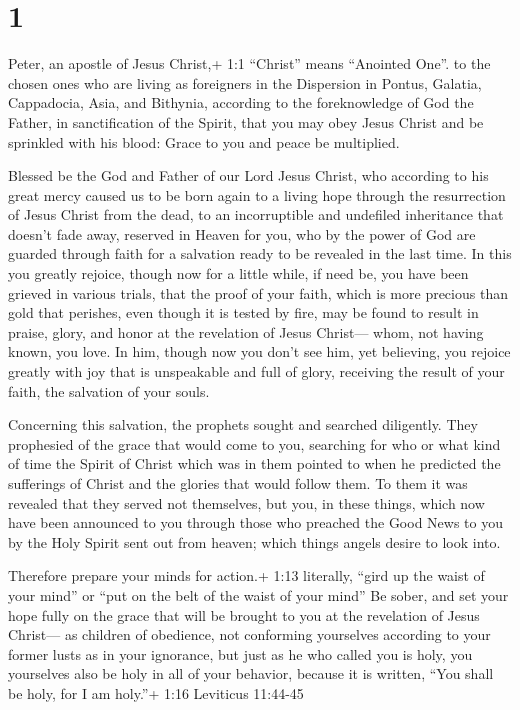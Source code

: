 \hypertarget{section}{%
\section{1}\label{section}}

 Peter, an apostle of Jesus Christ,+ 1:1 ``Christ'' means
``Anointed One''. to the chosen ones who are living as foreigners in the
Dispersion in Pontus, Galatia, Cappadocia, Asia, and Bithynia,
 according to the foreknowledge of God the Father, in
sanctification of the Spirit, that you may obey Jesus Christ and be
sprinkled with his blood: Grace to you and peace be multiplied.

 Blessed be the God and Father of our Lord Jesus Christ, who
according to his great mercy caused us to be born again to a living hope
through the resurrection of Jesus Christ from the dead,  to
an incorruptible and undefiled inheritance that doesn't fade away,
reserved in Heaven for you,  who by the power of God are
guarded through faith for a salvation ready to be revealed in the last
time.  In this you greatly rejoice, though now for a little
while, if need be, you have been grieved in various trials, 
that the proof of your faith, which is more precious than gold that
perishes, even though it is tested by fire, may be found to result in
praise, glory, and honor at the revelation of Jesus Christ---
 whom, not having known, you love. In him, though now you
don't see him, yet believing, you rejoice greatly with joy that is
unspeakable and full of glory,  receiving the result of your
faith, the salvation of your souls.

 Concerning this salvation, the prophets sought and
searched diligently. They prophesied of the grace that would come to
you,  searching for who or what kind of time the Spirit of
Christ which was in them pointed to when he predicted the sufferings of
Christ and the glories that would follow them.  To them it
was revealed that they served not themselves, but you, in these things,
which now have been announced to you through those who preached the Good
News to you by the Holy Spirit sent out from heaven; which things angels
desire to look into.

 Therefore prepare your minds for action.+ 1:13 literally,
``gird up the waist of your mind'' or ``put on the belt of the waist of
your mind'' Be sober, and set your hope fully on the grace that will be
brought to you at the revelation of Jesus Christ---  as
children of obedience, not conforming yourselves according to your
former lusts as in your ignorance,  but just as he who
called you is holy, you yourselves also be holy in all of your behavior,
 because it is written, ``You shall be holy, for I am
holy.''+ 1:16 Leviticus 11:44-45

